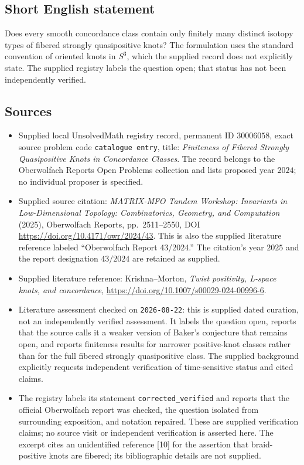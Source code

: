 \documentclass[11pt]{article}
\begin{document}
\subsection{Short English statement}
Does every smooth concordance class contain only finitely many distinct isotopy types of fibered strongly quasipositive knots? The formulation uses the standard convention of oriented knots in $S^3$, which the supplied record does not explicitly state. The supplied registry labels the question open; that status has not been independently verified.
\subsection{Sources}
\begin{itemize}
\item Supplied local UnsolvedMath registry record, permanent ID $30006058$, exact source problem code \texttt{catalogue entry}, title: \emph{Finiteness of Fibered Strongly Quasipositive Knots in Concordance Classes}. The record belongs to the Oberwolfach Reports Open Problems collection and lists proposed year $2024$; no individual proposer is specified.
\item Supplied source citation: \emph{MATRIX-MFO Tandem Workshop: Invariants in Low-Dimensional Topology: Combinatorics, Geometry, and Computation} (2025), Oberwolfach Reports, pp.~2511--2550, DOI \url{https://doi.org/10.4171/owr/2024/43}. This is also the supplied literature reference labeled ``Oberwolfach Report 43/2024.'' The citation's year $2025$ and the report designation $43/2024$ are retained as supplied.
\item Supplied literature reference: Krishna--Morton, \emph{Twist positivity, L-space knots, and concordance}, \url{https://doi.org/10.1007/s00029-024-00996-6}.
\item Literature assessment checked on \texttt{2026-08-22}: this is supplied dated curation, not an independently verified assessment. It labels the question open, reports that the source calls it a weaker version of Baker's conjecture that remains open, and reports finiteness results for narrower positive-knot classes rather than for the full fibered strongly quasipositive class. The supplied background explicitly requests independent verification of time-sensitive status and cited claims.
\item The registry labels its statement \texttt{corrected\_verified} and reports that the official Oberwolfach report was checked, the question isolated from surrounding exposition, and notation repaired. These are supplied verification claims; no source visit or independent verification is asserted here. The excerpt cites an unidentified reference [10] for the assertion that braid-positive knots are fibered; its bibliographic details are not supplied.
\end{itemize}
\end{document}
